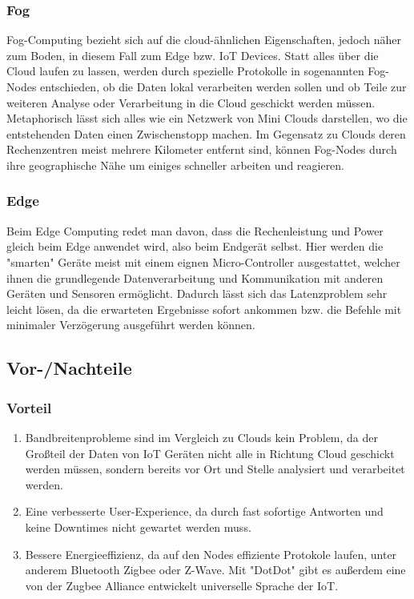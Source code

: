 \documentclass[conference]{IEEEtran}
\begin{document}
\subsubsection{Fog}
Fog-Computing bezieht sich auf die cloud-ähnlichen Eigenschaften, jedoch näher zum Boden, in diesem Fall zum Edge bzw. IoT Devices. 
Statt alles über die Cloud laufen zu lassen, werden durch spezielle Protokolle in sogenannten Fog-Nodes entschieden, ob die Daten lokal verarbeiten werden sollen und ob Teile zur weiteren Analyse oder Verarbeitung in die Cloud geschickt werden müssen. Metaphorisch lässt sich alles wie ein Netzwerk von Mini Clouds darstellen, wo die entstehenden Daten einen Zwischenstopp machen. Im Gegensatz zu Clouds deren Rechenzentren meist mehrere Kilometer entfernt sind, können Fog-Nodes durch ihre geographische Nähe um einiges schneller arbeiten und reagieren.

\subsubsection{Edge}
Beim Edge Computing redet man davon, dass die Rechenleistung und Power gleich beim Edge anwendet wird, also beim Endgerät selbst. Hier werden die "smarten" Geräte meist mit einem eignen Micro-Controller ausgestattet, welcher ihnen die grundlegende Datenverarbeitung und Kommunikation mit anderen Geräten und Sensoren ermöglicht. Dadurch lässt sich das Latenzproblem sehr leicht lösen, da die erwarteten Ergebnisse sofort ankommen bzw. die Befehle mit minimaler Verzögerung ausgeführt werden können.
\subsection{Vor-/Nachteile}
\subsubsection{Vorteil}
\begin{enumerate}
	\item Bandbreitenprobleme sind im Vergleich zu Clouds kein Problem, da der Großteil der Daten von IoT Geräten nicht alle in Richtung Cloud geschickt werden müssen, sondern bereits vor Ort und Stelle analysiert und verarbeitet werden. 
	\item Eine verbesserte User-Experience, da durch fast sofortige Antworten und keine Downtimes nicht gewartet werden muss.
	\item Bessere Energieeffizienz, da auf den Nodes effiziente Protokole laufen, unter anderem Bluetooth Zigbee oder Z-Wave. Mit "DotDot" gibt es außerdem eine von der Zugbee Alliance entwickelt universelle Sprache der IoT.
\end{enumerate}
\end{document}
